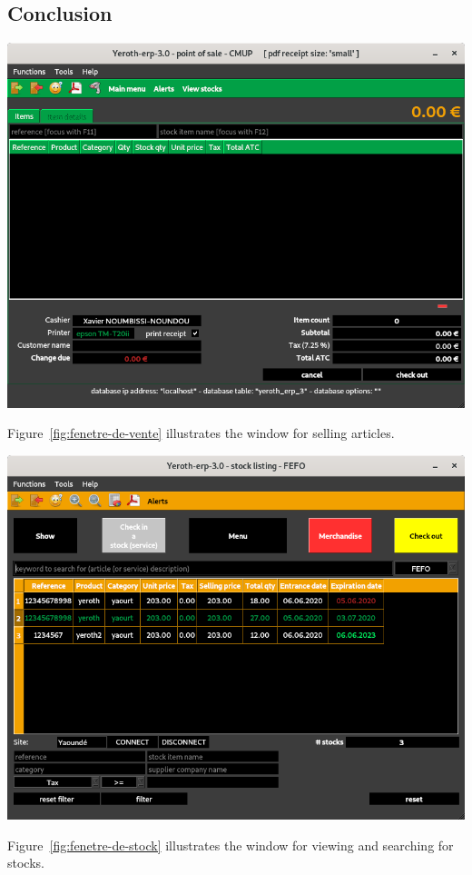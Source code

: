 \documentclass[a4paper, 10pt]{article}
\begin{document}
\begin{multicols}{2}
\section{Conclusion}
\begin{center}
\includegraphics[scale=0.33]{../../francais/images/yeren-pos-7-0-window-cashier.png}
\label{fig:fenetre-de-vente}
\end{center}

Figure~\ref{fig:fenetre-de-vente} illustrates
the window for selling articles.

\begin{center}
\includegraphics[scale=0.33]{images/yeroth-stock-listing-window.png}
\label{fig:fenetre-de-stock}
\end{center}

Figure~\ref{fig:fenetre-de-stock} illustrates
the window for viewing and searching for stocks.

\end{multicols}
\end{document}
